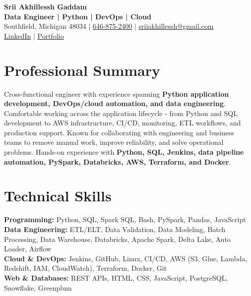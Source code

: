 \documentclass[letterpaper,10pt]{article}
\begin{document}
\fontsize{9.35pt}{10.45pt}\selectfont

\begin{center}
    {\LARGE \textbf{Srii Akhillessh Gaddam}} \\[-1pt]
    \textbf{Data Engineer | Python | DevOps | Cloud} \\[2pt]
    Southfield, Michigan 48034 $|$
    \href{tel:6468752400}{646-875-2400} $|$
    \href{mailto:sriiakhillessh@gmail.com}{sriiakhillessh@gmail.com} \\[1pt]
    \href{https://www.linkedin.com/in/srii-akhiilessh-gaddam-b48668191/}{LinkedIn} $|$
    \href{https://sriiakhillesshg.github.io/portfolio/}{Portfolio}
\end{center}
\vspace{-8pt}

\section{Professional Summary}
\small{Cross-functional engineer with experience spanning \textbf{Python application development, DevOps/cloud automation, and data engineering}. Comfortable working across the application lifecycle - from Python and SQL development to AWS infrastructure, CI/CD, monitoring, ETL workflows, and production support. Known for collaborating with engineering and business teams to remove manual work, improve reliability, and solve operational problems. Hands-on experience with \textbf{Python, SQL, Jenkins, data pipeline automation, PySpark, Databricks, AWS, Terraform, and Docker}.}

\section{Technical Skills}
\small{
\textbf{Programming:} Python, SQL, Spark SQL, Bash, PySpark, Pandas, JavaScript \\
\textbf{Data Engineering:} ETL/ELT, Data Validation, Data Modeling, Batch Processing, Data Warehouse, Databricks, Apache Spark, Delta Lake, Auto Loader, Airflow \\
\textbf{Cloud \& DevOps:} Jenkins, GitHub, Linux, CI/CD, AWS (S3, Glue, Lambda, Redshift, IAM, CloudWatch), Terraform, Docker, Git \\
\textbf{Web \& Databases:} REST APIs, HTML, CSS, JavaScript, PostgreSQL, Snowflake, Greenplum
}
\end{document}
